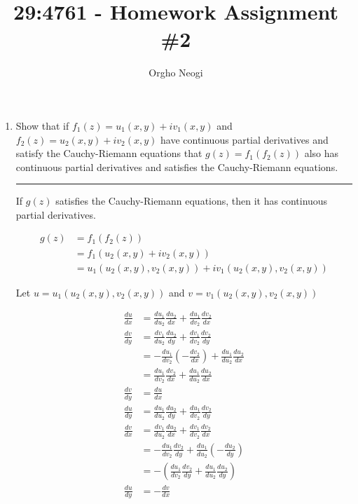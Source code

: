 \documentclass[12pt, oneside]{article}
\title{29:4761 - Homework Assignment \#2}
\author{Orgho Neogi}
\date{}
\newenvironment{answer}
  {\vspace*{0.2cm} \rule{12cm}{0.02cm} \vspace*{0.2cm}}
  {\vspace*{0.2cm}}
\begin{document}
\maketitle

\begin{enumerate}
  \item Show that if $f_1(z) = u_1(x,y) + iv_1(x,y)$ and $f_2(z) = u_2(x,y) + iv_2(x,y)$ have continuous partial derivatives and satisfy the Cauchy-Riemann equations that $g(z) = f_1(f_2(z))$ also has continuous partial derivatives and satisfies the Cauchy-Riemann equations.

  \begin{answer}

    If $g(z)$ satisfies the Cauchy-Riemann equations, then it has continuous partial derivatives.

    \begin{align*}
      g(z) &= f_1(f_2(z))\\
           &= f_1(u_2(x,y) + iv_2(x,y))\\
           &= u_1(u_2(x,y),v_2(x,y)) + iv_1(u_2(x,y),v_2(x,y))
    \end{align*}

    Let $u = u_1(u_2(x,y),v_2(x,y))$ and $v = v_1(u_2(x,y),v_2(x,y))$

    \begin{align*}
      \frac{du}{dx} &= \frac{du_1}{du_2}\frac{du_2}{dx} +\frac{du_1}{dv_2}\frac{dv_2}{dx}\\
      \frac{dv}{dy} &= \frac{dv_1}{du_2}\frac{du_2}{dy} +\frac{dv_1}{dv_2}\frac{dv_2}{dy}\\
                    &= -\frac{du_1}{dv_2}\left(-\frac{dv_2}{dx}\right) +\frac{du_1}{du_2}\frac{du_2}{dx}\\
                    &= \frac{du_1}{dv_2}\frac{dv_2}{dx}+\frac{du_1}{du_2}\frac{du_2}{dx}\\
      \frac{dv}{dy} &= \frac{du}{dx}\\
      \frac{du}{dy} &=\frac{du_1}{du_2}\frac{du_2}{dy} +\frac{du_1}{dv_2}\frac{dv_2}{dy}\\
      \frac{dv}{dx} &= \frac{dv_1}{du_2}\frac{du_2}{dx} +\frac{dv_1}{dv_2}\frac{dv_2}{dx}\\
                    &= -\frac{du_1}{dv_2}\frac{dv_2}{dy} +\frac{du_1}{du_2}\left(-\frac{du_2}{dy}\right)\\
                    &= -\left(\frac{du_1}{dv_2}\frac{dv_2}{dy} +\frac{du_1}{du_2}\frac{du_2}{dy}\right)\\
      \frac{du}{dy} &= -\frac{dv}{dx}
    \end{align*}
  \end{answer}


\end{enumerate}
\end{document}
